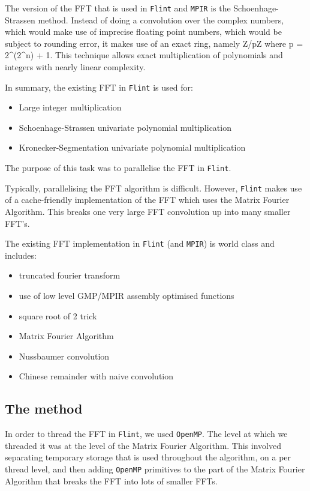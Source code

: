 The version of the FFT that is used in \texttt{Flint} and \texttt{MPIR}
is the Schoenhage-Strassen method. Instead of doing a convolution over
the complex numbers, which would make use of imprecise floating point
numbers, which would be subject to rounding error, it makes use of an
exact ring, namely Z/pZ where p = 2\^{}(2\^{}n) + 1. This technique
allows exact multiplication of polynomials and integers with nearly
linear complexity.

In summary, the existing FFT in \texttt{Flint} is used for:

\begin{itemize}
\tightlist
\item
  Large integer multiplication
\item
  Schoenhage-Strassen univariate polynomial multiplication
\item
  Kronecker-Segmentation univariate polynomial multiplication
\end{itemize}

The purpose of this task was to parallelise the FFT in \texttt{Flint}.

Typically, parallelising the FFT algorithm is difficult. However,
\texttt{Flint} makes use of a cache-friendly implementation of the FFT
which uses the Matrix Fourier Algorithm. This breaks one very large FFT
convolution up into many smaller FFT's.

The existing FFT implementation in \texttt{Flint} (and \texttt{MPIR}) is
world class and includes:

\begin{itemize}
\tightlist
\item
  truncated fourier transform
\item
  use of low level GMP/MPIR assembly optimised functions
\item
  square root of 2 trick
\item
  Matrix Fourier Algorithm
\item
  Nussbaumer convolution
\item
  Chinese remainder with naive convolution
\end{itemize}

\subsection{The method}\label{the-method}

In order to thread the FFT in \texttt{Flint}, we used \texttt{OpenMP}.
The level at which we threaded it was at the level of the Matrix Fourier
Algorithm. This involved separating temporary storage that is used
throughout the algorithm, on a per thread level, and then adding
\texttt{OpenMP} primitives to the part of the Matrix Fourier Algorithm
that breaks the FFT into lots of smaller FFTs.

